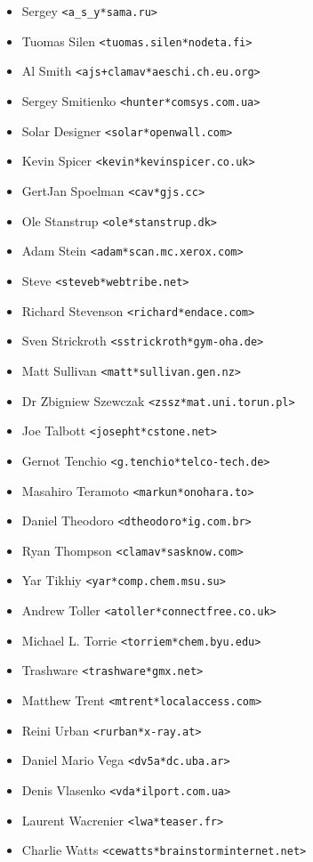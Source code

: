 \documentclass[a4paper,titlepage,12pt]{article}
\newcommand{\email}[1]{\texttt{#1}}
\begin{document}
\begin{itemize}
	\item Sergey \email{<a\_s\_y*sama.ru>}
	\item Tuomas Silen \email{<tuomas.silen*nodeta.fi>}
	\item Al Smith \email{<ajs+clamav*aeschi.ch.eu.org>}
	\item Sergey Smitienko \email{<hunter*comsys.com.ua>}
	\item Solar Designer \email{<solar*openwall.com>}
	\item Kevin Spicer \email{<kevin*kevinspicer.co.uk>}
	\item GertJan Spoelman \email{<cav*gjs.cc>}
	\item Ole Stanstrup \email{<ole*stanstrup.dk>}
	\item Adam Stein \email{<adam*scan.mc.xerox.com>}
	\item Steve \email{<steveb*webtribe.net>}
	\item Richard Stevenson \email{<richard*endace.com>}
	\item Sven Strickroth \email{<sstrickroth*gym-oha.de>}
	\item Matt Sullivan \email{<matt*sullivan.gen.nz>}
	\item Dr Zbigniew Szewczak \email{<zssz*mat.uni.torun.pl>}
	\item Joe Talbott \email{<josepht*cstone.net>}
	\item Gernot Tenchio \email{<g.tenchio*telco-tech.de>}
	\item Masahiro Teramoto \email{<markun*onohara.to>}
	\item Daniel Theodoro \email{<dtheodoro*ig.com.br>}
	\item Ryan Thompson \email{<clamav*sasknow.com>}
	\item Yar Tikhiy \email{<yar*comp.chem.msu.su>}
	\item Andrew Toller \email{<atoller*connectfree.co.uk>}
	\item Michael L. Torrie \email{<torriem*chem.byu.edu>}
	\item Trashware \email{<trashware*gmx.net>}
	\item Matthew Trent \email{<mtrent*localaccess.com>}
	\item Reini Urban \email{<rurban*x-ray.at>}
	\item Daniel Mario Vega \email{<dv5a*dc.uba.ar>}
	\item Denis Vlasenko \email{<vda*ilport.com.ua>}
	\item Laurent Wacrenier \email{<lwa*teaser.fr>}
	\item Charlie Watts \email{<cewatts*brainstorminternet.net>}

\end{itemize}
\end{document}
